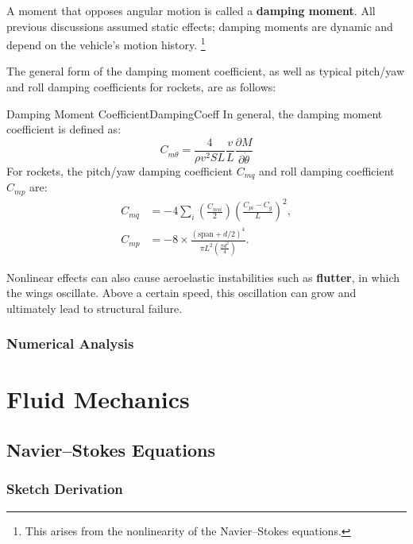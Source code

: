 \documentclass[uplatex,dvipdfmx,a4paper,11pt]{report}
\newcommand{\keyword}[1]{\textcolor{mainblue}{\textbf{#1}}}
\numberwithin{equation}{chapter}
\begin{document}
\enskip

A moment that opposes angular motion is called a \keyword{damping moment}. All previous discussions assumed static effects; damping moments are dynamic and depend on the vehicle's motion history.
\footnote{This arises from the nonlinearity of the Navier--Stokes equations.}

The general form of the damping moment coefficient, as well as typical pitch/yaw and roll damping coefficients for rockets, are as follows:
\begin{definition}{Damping Moment Coefficient}{DampingCoeff}{}
  In general, the damping moment coefficient is defined as:
  \begin{equation}
  C_{m\dot{\theta}} = \frac{4}{\rho v^2 S L}\frac{v}{L}\frac{\partial M}{\partial\dot{\theta}} \label{fte_def}
  \end{equation}
  For rockets, the pitch/yaw damping coefficient $C_{mq}$ and roll damping coefficient $C_{mp}$ are:
  \begin{align}
    C_{mq} &= - 4 \sum_i \left(\frac{C_{n\alpha i}}{2}\right)\left(\frac{C_{pi} - C_{g}}{L}\right)^2,\\
    C_{mp} &= - 8 \times \frac{\left(\mathrm{span} + d/2\right)^4}{\pi L^2 \left(\frac{\pi d^2}{4}\right)}.
  \end{align}
\end{definition}

\enskip

Nonlinear effects can also cause aeroelastic instabilities such as \keyword{flutter}, in which the wings oscillate. Above a certain speed, this oscillation can grow and ultimately lead to structural failure.

\subsection{Numerical Analysis}

\chapter{Fluid Mechanics}

\section{Navier--Stokes Equations}
\subsection{Sketch Derivation}
\end{document}
